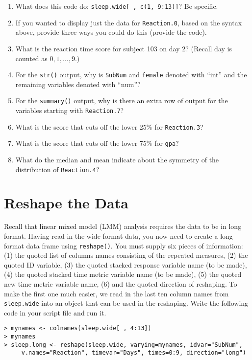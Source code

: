 \documentclass[]{article}
\begin{document}
\begin{enumerate}
\item What does this code do: \texttt{sleep.wide[ , c(1, 9:13)]}? Be specific.
\item If you wanted to display just the data for \texttt{Reaction.0}, based on the syntax above, provide three ways you could do this (provide the code).
\item What is the reaction time score for subject 103 on day 2? (Recall day is counted as $0, 1, \ldots, 9$.)
\item For the \texttt{str()} output, why is \texttt{SubNum} and \texttt{female} denoted with ``int'' and the remaining variables denoted with ``num''?
\item For the \texttt{summary()} output, why is there an extra row of output for the variables starting with \texttt{Reaction.7}?
\item What is the score that cuts off the lower 25\% for \texttt{Reaction.3}?
\item What is the score that cuts off the lower 75\% for \texttt{gpa}?
\item What do the median and mean indicate about the symmetry of the distribution of \texttt{Reaction.4}?
\end{enumerate}
\pagebreak

%
%

\section*{Reshape the Data} 
 
\noindent Recall that linear mixed model (LMM) analysis requires the data to be in long format. Having read in the wide format data, you now need to create a long format data frame using \texttt{reshape()}. You must supply six pieces of information: (1) the quoted list of columns names consisting of the repeated measures, (2) the quoted ID variable, (3) the quoted stacked response variable name (to be made), (4) the quoted stacked time metric variable name (to be made), (5) the quoted new time metric variable name, (6) and the quoted direction of reshaping. To make the first one much easier, we read in the last ten column names from \texttt{sleep.wide} into an object that can be used in the
reshaping. Write the following code in your script file and run it.

\begin{verbatim}
> mynames <- colnames(sleep.wide[ , 4:13])
> mynames
> sleep.long <- reshape(sleep.wide, varying=mynames, idvar="SubNum",
     v.names="Reaction", timevar="Days", times=0:9, direction="long")
\end{verbatim}
\end{document}

